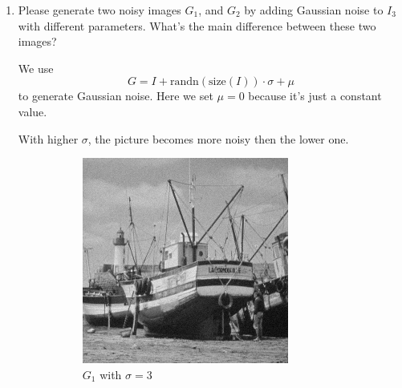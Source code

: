 \documentclass{article}
\begin{document}
\begin{enumerate}[label=(\alph*)]
    \item Please generate two noisy images $G_1$, and $G_2$ by adding Gaussian noise to $I_3$ with different parameters. What's the main difference between these two images?

    We use $$G = I + \mbox{randn}(\mbox{size}(I)) \cdot \sigma + \mu$$ to generate Gaussian noise. Here we set $\mu = 0$ because it's just a constant value.

    With higher $\sigma$, the picture becomes more noisy then the lower one.

    \begin{figure}[!htb]
        \centering
        \begin{subfigure}[b]{0.3\textwidth}
            \includegraphics[width=\textwidth]{img/G1.png}
            \caption{$G_1$ with $\sigma = 3$}
        \end{subfigure}
        ~
        \begin{subfigure}[b]{0.3\textwidth}

\end{subfigure}
\end{figure}
\end{enumerate}
\end{document}
